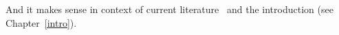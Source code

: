 And it makes sense in context of current literature~\citep{uchiyama2006} and
the introduction (see Chapter~\ref{intro}).
